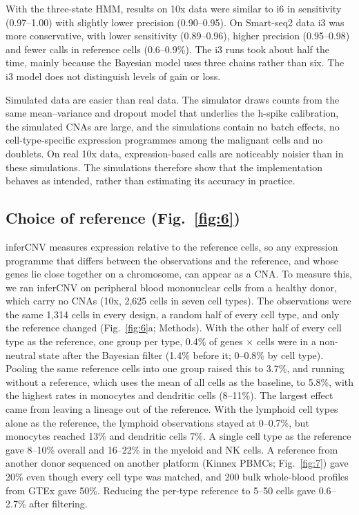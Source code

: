 With the three-state HMM, results on 10x data were similar to i6 in sensitivity (0.97--1.00) with slightly lower precision (0.90--0.95). On Smart-seq2 data i3 was more conservative, with lower sensitivity (0.89--0.96), higher precision (0.95--0.98) and fewer calls in reference cells (0.6--0.9\%). The i3 runs took about half the time, mainly because the Bayesian model uses three chains rather than six. The i3 model does not distinguish levels of gain or loss.

Simulated data are easier than real data. The simulator draws counts from the same mean--variance and dropout model that underlies the h-spike calibration, the simulated CNAs are large, and the simulations contain no batch effects, no cell-type-specific expression programmes among the malignant cells and no doublets. On real 10x data, expression-based calls are noticeably noisier than in these simulations. The simulations therefore show that the implementation behaves as intended, rather than estimating its accuracy in practice.

\subsection{Choice of reference (Fig.~\ref{fig:6})}

inferCNV measures expression relative to the reference cells, so any expression programme that differs between the observations and the reference, and whose genes lie close together on a chromosome, can appear as a CNA. To measure this, we ran inferCNV on peripheral blood mononuclear cells from a healthy donor, which carry no CNAs \citep{tenx2016pbmc3k, xclonedata} (10x, 2,625 cells in seven cell types). The observations were the same 1,314 cells in every design, a random half of every cell type, and only the reference changed (Fig.~\ref{fig:6}a; Methods). With the other half of every cell type as the reference, one group per type, 0.4\% of genes $\times$ cells were in a non-neutral state after the Bayesian filter (1.4\% before it; 0--0.8\% by cell type). Pooling the same reference cells into one group raised this to 3.7\%, and running without a reference, which uses the mean of all cells as the baseline, to 5.8\%, with the highest rates in monocytes and dendritic cells (8--11\%). The largest effect came from leaving a lineage out of the reference. With the lymphoid cell types alone as the reference, the lymphoid observations stayed at 0--0.7\%, but monocytes reached 13\% and dendritic cells 7\%. A single cell type as the reference gave 8--10\% overall and 16--22\% in the myeloid and NK cells. A reference from another donor sequenced on another platform (Kinnex PBMCs; Fig.~\ref{fig:7}) gave 20\% even though every cell type was matched, and 200 bulk whole-blood profiles from GTEx \citep{gtex2020} gave 50\%. Reducing the per-type reference to 5--50 cells gave 0.6--2.7\% after filtering.

